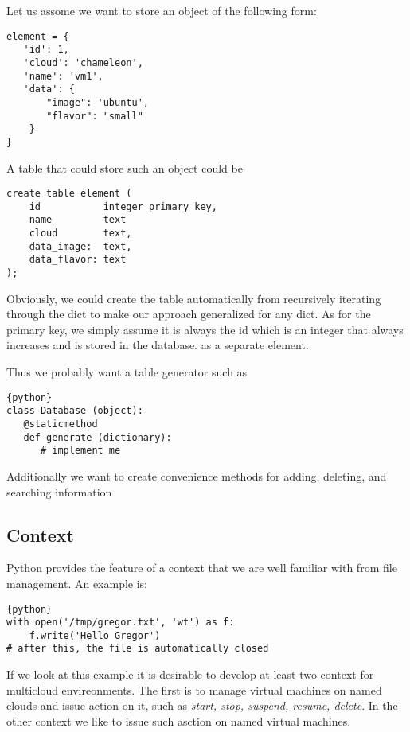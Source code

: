 Let us assome we want to store an object of the following form:

\begin{verbatim}
element = {
   'id': 1,
   'cloud': 'chameleon',
   'name': 'vm1',
   'data': {
       "image": 'ubuntu',
       "flavor": "small"
    }
}
\end{verbatim}

A table that could store such an object could be

\begin{verbatim}
create table element (
    id           integer primary key,
    name         text
    cloud        text,
    data_image:  text,
    data_flavor: text
);
\end{verbatim}

Obviously, we could create the table automatically from recursively
iterating through the dict to make our approach generalized for any
dict. As for the primary key, we simply assume it is always the id
which is an integer that always increases and is stored in the database.
as a separate element.

Thus we probably want a table generator such as

\begin{lstlisting}{python}
class Database (object):
   @staticmethod
   def generate (dictionary):
      # implement me
\end{lstlisting}

Additionally we want to create convenience methods for adding,
deleting, and searching information


\subsection{Context}

Python provides the feature of a context that we are well familiar
with from file management. An example is:

\begin{lstlisting}{python}
with open('/tmp/gregor.txt', 'wt') as f:
    f.write('Hello Gregor')
# after this, the file is automatically closed
\end{lstlisting}

If we look at this example it is desirable to develop at least two
context for multicloud envireonments. The first is to manage virtual
machines on named clouds and issue action on it, such as \textit{start, stop,
  suspend, resume, delete}. In the other context we like to issue
such asction on named virtual machines.

